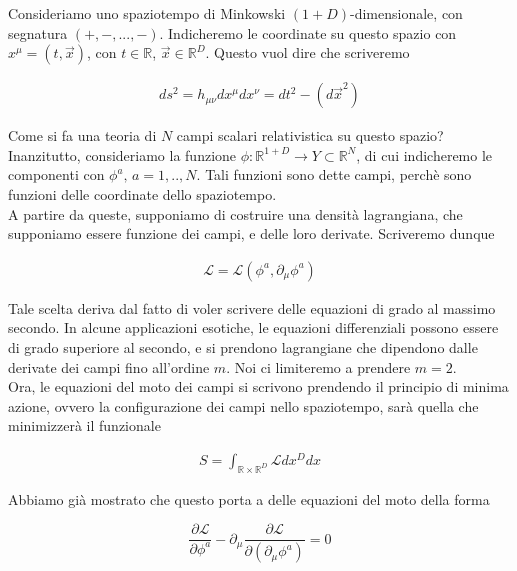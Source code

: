 \documentclass{report}
\begin{document}
Consideriamo uno spaziotempo di Minkowski \((1+D)\)-dimensionale, con segnatura \((+, -, ..., -)\). Indicheremo le coordinate su questo spazio con \(x^{\mu} = (t, \vec{x})\), con \(t \in \mathbb{R}\), \(\vec{x}\in \mathbb{R}^{D}\). Questo vuol dire che scriveremo 

\begin{align}
    ds^2 = h_{\mu\nu}dx^{\mu}dx^{\nu} = dt^2 - (d\vec{x}^2)
\end{align}

Come si fa una teoria di \(N\) campi scalari relativistica su questo spazio? \\ 

Inanzitutto, consideriamo la funzione \(\phi : \mathbb{R}^{1+D} \rightarrow Y \subset \mathbb{R}^N\), di cui indicheremo le componenti con \(\phi^a, \, a = 1, .., N\). Tali funzioni sono dette campi, perchè sono funzioni delle coordinate dello spaziotempo. \\

A partire da queste, supponiamo di costruire una densità lagrangiana, che supponiamo essere funzione dei campi, e delle loro derivate. Scriveremo dunque 

\begin{align}
    \mathcal{L} = \mathcal{L}(\phi^a, \partial_\mu \phi^a)
\end{align}

Tale scelta deriva dal fatto di voler scrivere delle equazioni di grado al massimo secondo. In alcune applicazioni esotiche, le equazioni differenziali possono essere di grado superiore al secondo, e si prendono lagrangiane che dipendono dalle derivate dei campi fino all'ordine \(m\). Noi ci limiteremo a prendere \(m = 2\). \\

Ora, le equazioni del moto dei campi si scrivono prendendo il principio di minima azione, ovvero la configurazione dei campi nello spaziotempo, sarà quella che minimizzerà il funzionale 

\begin{align}
    S = \int_{\mathbb{R}\times \mathbb{R}^D}\mathcal{L}dx^{D}dx
\end{align}

Abbiamo già mostrato che questo porta a delle equazioni del moto della forma 

\begin{equation}
    \frac{\partial \mathcal{L}}{\partial \phi^a} - \partial_\mu \frac{\partial \mathcal{L}}{\partial (\partial_\mu \phi^a)} = 0 
\end{equation}
\end{document}

